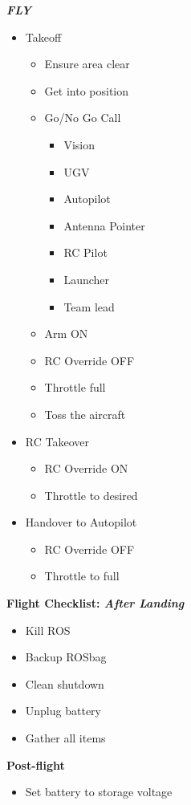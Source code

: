 \documentclass[]{auvsi_doc}
\begin{document}
\textit{\textbf{FLY}}
\begin{itemize}
	\item Takeoff
	\begin{itemize}
		\item Ensure area clear
		\item Get into position
		\item Go/No Go Call
		\begin{itemize}
			\item Vision
			\item UGV
			\item Autopilot
			\item Antenna Pointer
			\item RC Pilot
			\item Launcher
			\item Team lead
		\end{itemize}
		\item Arm ON
		\item RC Override OFF
		\item Throttle full
		\item Toss the aircraft
	\end{itemize}
	\item RC Takeover
	\begin{itemize}
		\item RC Override ON
		\item Throttle to desired
	\end{itemize}
	\item Handover to Autopilot
	\begin{itemize}
		\item RC Override OFF
		\item Throttle to full
	\end{itemize}
\end{itemize}



\hrulefill

\textbf{Flight Checklist: \textit{After Landing}}
\begin{itemize}
	\item Kill ROS
	\item Backup ROSbag
	\item Clean shutdown
	\item Unplug battery
	\item Gather all items
\end{itemize}

\hrulefill

\textbf{Post-flight}
\begin{itemize}
	\item Set battery to storage voltage
\end{itemize}
\end{document}
